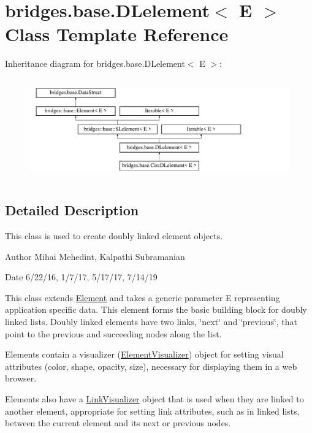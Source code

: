 \hypertarget{classbridges_1_1base_1_1_d_lelement}{}\section{bridges.\+base.\+D\+Lelement$<$ E $>$ Class Template Reference}
\label{classbridges_1_1base_1_1_d_lelement}
Inheritance diagram for bridges.\+base.\+D\+Lelement$<$ E $>$\+:\begin{figure}[H]
\begin{center}
\leavevmode
\includegraphics[height=4.402516cm]{classbridges_1_1base_1_1_d_lelement}
\end{center}
\end{figure}


\subsection{Detailed Description}
This class is used to create doubly linked element objects. 

\begin{DoxyAuthor}{Author}
Mihai Mehedint, Kalpathi Subramanian
\end{DoxyAuthor}
\begin{DoxyDate}{Date}
6/22/16, 1/7/17, 5/17/17, 7/14/19
\end{DoxyDate}
This class extends \hyperlink{classbridges_1_1base_1_1_element}{Element} and takes a generic parameter E representing application specific data. This element forms the basic building block for doubly linked lists. Doubly linked elements have two links, \char`\"{}next\char`\"{} and \char`\"{}previous\char`\"{}, that point to the previous and succeeding nodes along the list.

Elements contain a visualizer (\hyperlink{classbridges_1_1base_1_1_element_visualizer}{Element\+Visualizer}) object for setting visual attributes (color, shape, opacity, size), necessary for displaying them in a web browser.

Elements also have a \hyperlink{classbridges_1_1base_1_1_link_visualizer}{Link\+Visualizer} object that is used when they are linked to another element, appropriate for setting link attributes, such as in linked lists, between the current element and its next or previous nodes.

